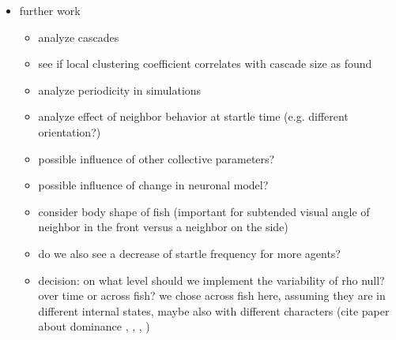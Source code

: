 \documentclass[a4paper,10pt,hidelinks]{scrreprt}
\begin{document}
	\begin{itemize}
		\item further work
        \begin{itemize}
        	\item analyze cascades
            \item see if local clustering coefficient correlates with cascade size as \cite{Rosenthal2015} found
            \item analyze periodicity in simulations
            \item analyze effect of neighbor behavior at startle time (e.g. different orientation?)
            \item possible influence of other collective parameters?
            \item possible influence of change in neuronal model?
            \item consider body shape of fish (important for subtended visual angle of neighbor in the front versus a neighbor on the side)
            \item do we also see a decrease of startle frequency for more agents?
            \item decision: on what level should we implement the variability of rho null? over 
            time or across fish? we chose across fish here, assuming they are in different internal 
            states, maybe also with different characters (cite paper about dominance 
            \cite{Khan2017}, \cite{Miller2017}, \cite{Neumeister2010}, \cite{Park2018})
        \end{itemize}
	\end{itemize}
	\newpage
	\printbibliography[heading=bibintoc]
	

	
\end{document}
